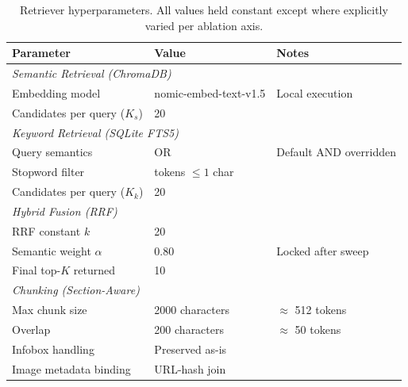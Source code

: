 \documentclass[11pt,a4paper]{article}
\begin{document}
\begin{table}[h]
\caption{Retriever hyperparameters. All values held constant except where explicitly varied per ablation axis.}
\label{tab:retriever-hyperparams}
\centering
\begin{tabular}{lll}
\toprule
\textbf{Parameter} & \textbf{Value} & \textbf{Notes} \\
\midrule
\multicolumn{3}{l}{\textit{Semantic Retrieval (ChromaDB)}} \\
Embedding model & nomic-embed-text-v1.5 & Local execution \\
Candidates per query ($K_s$) & 20 & \\
\midrule
\multicolumn{3}{l}{\textit{Keyword Retrieval (SQLite FTS5)}} \\
Query semantics & OR & Default AND overridden \\
Stopword filter & tokens $\leq 1$ char & \\
Candidates per query ($K_k$) & 20 & \\
\midrule
\multicolumn{3}{l}{\textit{Hybrid Fusion (RRF)}} \\
RRF constant $k$ & 20 & \\
Semantic weight $\alpha$ & 0.80 & Locked after sweep \\
Final top-$K$ returned & 10 & \\
\midrule
\multicolumn{3}{l}{\textit{Chunking (Section-Aware)}} \\
Max chunk size & 2000 characters & $\approx$ 512 tokens \\
Overlap & 200 characters & $\approx$ 50 tokens \\
Infobox handling & Preserved as-is & \\
Image metadata binding & URL-hash join & \\
\bottomrule
\end{tabular}

\end{table}
\end{document}
